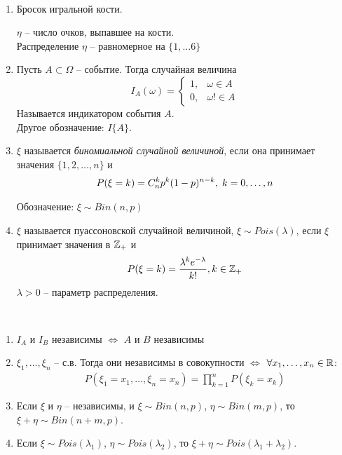 \begin{example}~
	\begin{enumerate}
		\item 
			Бросок игральной кости.

			$\eta$ -- число очков, выпавшее на кости.\\
			Распределение $\eta$ -- равномерное на $\{ 1, \ldots 6 \}$\\
			
		\item 
			Пусть $A \subset \Omega$ -- событие. Тогда случайная величина
			\begin{equation*}
				I_A(\omega) =
				\begin{cases}
					1, & \omega \in A\\
					0, & \omega !\in A
				\end{cases}		
			\end{equation*}
			Называется индикатором события $A.$\\
			Другое обозначение: $I\{ A \}$.
		
		\item 
			$\xi$ называется \emph{биномиальной случайной величиной}, если
			она принимает значения $\{1, 2, \ldots, n\}$ и
			\begin{align*}
				P(\xi = k) = C_{n}^{k} p^k (1 - p)^{n - k},\; k = 0, \ldots, n
			\end{align*}

			Обозначение: $\xi \sim Bin(n, p)$
		
		\item 
			$\xi$ называется пуассоновской случайной величиной, $\xi \sim Pois(\lambda)$, 
			если $\xi$ принимает значения в $\mathbb{Z}_+$ и
			\begin{align*}
				P(\xi = k) = \frac{\lambda^k e^{-\lambda}}{k!}, k \in \mathbb{Z}_+
			\end{align*}
			$\lambda > 0$ -- параметр распределения.
	\end{enumerate}
\end{example}

\begin{exercise}~
	\begin{enumerate}
		\item $I_A$ и $I_B$ независимы $\iff$ $A$ и $B$ независимы
		\item 
			$\xi_1, \ldots, \xi_n$ -- с.в. Тогда они независимы в совокупности 
			$\iff$ $\forall x_1, \ldots, x_n \in \mathbb{R}$:
			\begin{align*}
				P(\xi_1 = x_1, \ldots, \xi_n = x_n) = \prod\limits_{k = 1}^{n} P(\xi_k = x_k)
			\end{align*}

		\item
			Если $\xi$ и $\eta$ -- независимы, и $\xi \sim Bin(n, p)$, $\eta \sim Bin(m, p)$, то
			$\xi + \eta \sim Bin(n + m, p)$.

		\item
			Если $\xi \sim Pois(\lambda_1)$, $\eta \sim Pois(\lambda_2)$, то
			$\xi + \eta \sim Pois(\lambda_1 + \lambda_2)$.

	\end{enumerate}
\end{exercise}

